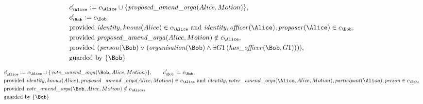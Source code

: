 \begin{align*}
&
c'_
{
\Alice
}
 := 
c_
{
\Alice
}
 \cup 
\{
\mathit{\detokenize{
proposed_amend_orga
}}
(
Alice
,
Motion
)
\}
,\\
&
c'_
{
\Bob
}
 := 
c_
{
\Bob
}
,\\
&
\text{provided } 
\mathit{\detokenize{
identity
}}
,
\mathit{\detokenize{
knows
}}
(
Alice
)
 \in c_
{
\Alice
}
 \text{ and } 
\mathit{\detokenize{
identity
}}
,
\mathit{\detokenize{
officer
}}
(
\Alice
)
,
\mathit{\detokenize{
proposer
}}
(
\Alice
)
 \in c_
{
\Bob
}
,\\
&
\text{provided } 
\mathit{\detokenize{
proposed_amend_orga
}}
(
Alice
,
Motion
)
 \notin c_
{
\Alice
}
,\\
&
\text{provided } 
(
\mathit{\detokenize{
person
}}
(
\Bob
)
\lor
(
\mathit{\detokenize{
organisation
}}
(
\Bob
)
\land
\exists 
G1
\,(
\mathit{\detokenize{
has_officer
}}
(
\Bob
,
G1
)
)
)
)
,\\
&
\text{guarded by } \{
\Bob
\}
\end{align*}

\begin{align*}
&
c'_
{
\Alice
}
 := 
c_
{
\Alice
}
 \cup 
\{
\mathit{\detokenize{
vote_amend_orga
}}
(
\Bob
,
Alice
,
Motion
)
\}
, \qquad 
c'_
{
\Bob
}
 := 
c_
{
\Bob
}
,\\
&
\text{provided } 
\mathit{\detokenize{
identity
}}
,
\mathit{\detokenize{
knows
}}
(
Alice
)
,
\mathit{\detokenize{
proposed_amend_orga
}}
(
Alice
,
Motion
)
 \in c_
{
\Alice
}
 \text{ and } 
\mathit{\detokenize{
identity
}}
,
\mathit{\detokenize{
voter_amend_orga
}}
(
\Alice
,
Alice
,
Motion
)
,
\mathit{\detokenize{
participant
}}
(
\Alice
)
,
\mathit{\detokenize{
person
}}
 \in c_
{
\Bob
}
,\\
&
\text{provided } 
\mathit{\detokenize{
vote_amend_orga
}}
(
\Bob
,
Alice
,
Motion
)
 \notin c_
{
\Alice
}
,\\
&
\text{guarded by } \{
\Bob
\}
\end{align*}
